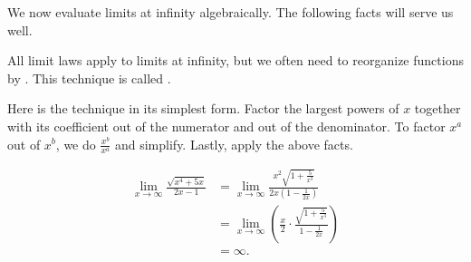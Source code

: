 \documentclass[../main.tex]{subfiles}
\begin{document}
We now evaluate limits at infinity algebraically. The following facts will serve us well.


\label{page:limits-at-infinity-strategy}
\faStar{} All limit laws apply to limits at infinity, but we often need to reorganize functions by . This technique is called .

Here is the technique in its simplest form. Factor the largest powers of \(x\) together with its coefficient out of the numerator and out of the denominator. To factor \(x^{a}\) out of \(x^{b}\), we do \(\frac{x^{b}}{x^{a}}\) and simplify. Lastly, apply the above facts.

\begin{minipage}{0.5\textwidth}
  \begin{align*}
    \lim_{x \to \infty} \frac{\sqrt{x^{4} + 5x}}{2x - 1}
    &= \lim_{x \to \infty} \frac{x^{2}\sqrt{1 + \frac{5}{x^{3}}}}{2x\left( 1 - \frac{1}{2x} \right)} \\[3ex]
    &= \lim_{x \to \infty} \left( \frac{x}{2} \cdot \frac{\sqrt{1 + \frac{5}{x^{3}}}}{1 - \frac{1}{2x}} \right) \\[3ex]
    &= \infty.
  \end{align*}
\end{minipage}
\end{document}

